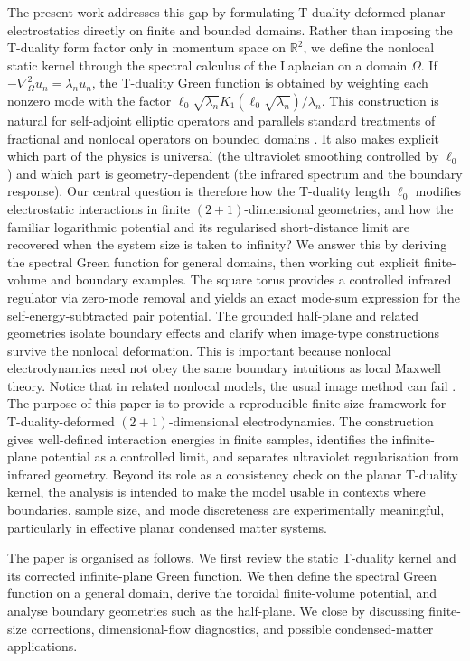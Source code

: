 \documentclass[openacc]{rsproca_new}%
\begin{document}
The present work addresses this gap by formulating T-duality-deformed planar electrostatics directly on finite and bounded domains. Rather than imposing the T-duality form factor only in momentum space on $\mathbb{R}^2$, we define the nonlocal static kernel through the spectral calculus of the Laplacian on a domain $\Omega$. If $-\nabla_\Omega^2 u_n=\lambda_n u_n$, the T-duality Green function is obtained by weighting each nonzero mode with the factor $\ell_0\sqrt{\lambda_n}K_1(\ell_0\sqrt{\lambda_n})/\lambda_n$. This construction is natural for self-adjoint elliptic operators and parallels standard treatments of fractional and nonlocal operators on bounded domains \cite{CaffarelliSilvestre2007, BonitoPasciak2015}. It also makes explicit which part of the physics is universal (the ultraviolet smoothing controlled by $\ell_0$) and which part is geometry-dependent (the infrared spectrum and the boundary response). Our central question is therefore how the T-duality length $\ell_0$ modifies electrostatic interactions in finite $(2+1)$-dimensional geometries, and how the familiar logarithmic potential and its regularised short-distance limit are recovered when the system size is taken to infinity? We answer this by deriving the spectral Green function for general domains, then working out explicit finite-volume and boundary examples. The square torus provides a controlled infrared regulator via zero-mode removal and yields an exact mode-sum expression for the self-energy-subtracted pair potential. The grounded half-plane and related geometries isolate boundary effects and clarify when image-type constructions survive the nonlocal deformation. This is important because nonlocal electrodynamics need not obey the same boundary intuitions as local Maxwell theory. Notice that in related nonlocal models, the usual image method can fail \cite{BorgesBufalo2025}. The purpose of this paper is to provide a reproducible finite-size framework for T-duality-deformed $(2+1)$-dimensional electrodynamics. The construction gives well-defined interaction energies in finite samples, identifies the infinite-plane potential as a controlled limit, and separates ultraviolet regularisation from infrared geometry. Beyond its role as a consistency check on the planar T-duality kernel, the analysis is intended to make the model usable in contexts where boundaries, sample size, and mode discreteness are experimentally meaningful, particularly in effective planar condensed matter systems.

The paper is organised as follows. We first review the static T-duality kernel and its corrected infinite-plane Green function. We then define the spectral Green function on a general domain, derive the toroidal finite-volume potential, and analyse boundary geometries such as the half-plane. We close by discussing finite-size corrections, dimensional-flow diagnostics, and possible condensed-matter applications.
\end{document}
